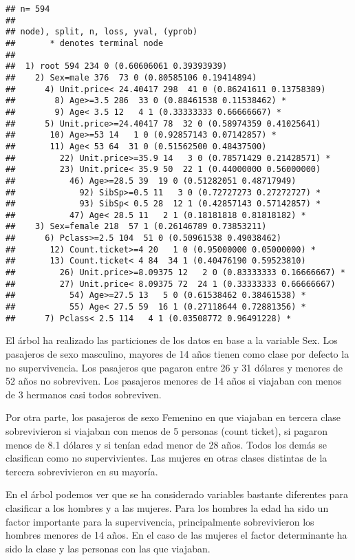 \documentclass[
]{article}
\begin{document}
\begin{verbatim}
## n= 594 
## 
## node), split, n, loss, yval, (yprob)
##       * denotes terminal node
## 
##  1) root 594 234 0 (0.60606061 0.39393939)  
##    2) Sex=male 376  73 0 (0.80585106 0.19414894)  
##      4) Unit.price< 24.40417 298  41 0 (0.86241611 0.13758389)  
##        8) Age>=3.5 286  33 0 (0.88461538 0.11538462) *
##        9) Age< 3.5 12   4 1 (0.33333333 0.66666667) *
##      5) Unit.price>=24.40417 78  32 0 (0.58974359 0.41025641)  
##       10) Age>=53 14   1 0 (0.92857143 0.07142857) *
##       11) Age< 53 64  31 0 (0.51562500 0.48437500)  
##         22) Unit.price>=35.9 14   3 0 (0.78571429 0.21428571) *
##         23) Unit.price< 35.9 50  22 1 (0.44000000 0.56000000)  
##           46) Age>=28.5 39  19 0 (0.51282051 0.48717949)  
##             92) SibSp>=0.5 11   3 0 (0.72727273 0.27272727) *
##             93) SibSp< 0.5 28  12 1 (0.42857143 0.57142857) *
##           47) Age< 28.5 11   2 1 (0.18181818 0.81818182) *
##    3) Sex=female 218  57 1 (0.26146789 0.73853211)  
##      6) Pclass>=2.5 104  51 0 (0.50961538 0.49038462)  
##       12) Count.ticket>=4 20   1 0 (0.95000000 0.05000000) *
##       13) Count.ticket< 4 84  34 1 (0.40476190 0.59523810)  
##         26) Unit.price>=8.09375 12   2 0 (0.83333333 0.16666667) *
##         27) Unit.price< 8.09375 72  24 1 (0.33333333 0.66666667)  
##           54) Age>=27.5 13   5 0 (0.61538462 0.38461538) *
##           55) Age< 27.5 59  16 1 (0.27118644 0.72881356) *
##      7) Pclass< 2.5 114   4 1 (0.03508772 0.96491228) *
\end{verbatim}

El árbol ha realizado las particiones de los datos en base a la variable
Sex. Los pasajeros de sexo masculino, mayores de 14 años tienen como
clase por defecto la no supervivencia. Los pasajeros que pagaron entre
26 y 31 dólares y menores de 52 años no sobreviven. Los pasajeros
menores de 14 años si viajaban con menos de 3 hermanos casi todos
sobreviven.

Por otra parte, los pasajeros de sexo Femenino en que viajaban en
tercera clase sobrevivieron si viajaban con menos de 5 personas (count
ticket), si pagaron menos de 8.1 dólares y si tenían edad menor de 28
años. Todos los demás se clasifican como no supervivientes. Las mujeres
en otras clases distintas de la tercera sobrevivieron en su mayoría.

En el árbol podemos ver que se ha considerado variables bastante
diferentes para clasificar a los hombres y a las mujeres. Para los
hombres la edad ha sido un factor importante para la supervivencia,
principalmente sobrevivieron los hombres menores de 14 años. En el caso
de las mujeres el factor determinante ha sido la clase y las personas
con las que viajaban.
\end{document}
